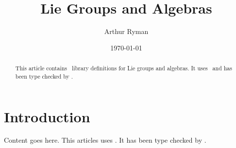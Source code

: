 \documentclass{amsart}
\begin{document}
\title{Lie Groups and Algebras}
\author{Arthur Ryman}
\date{\today}

\begin{abstract}
    This article contains \mathz\ library definitions for
    Lie groups and algebras.
    It uses \ZN\ and has been type checked by \fuzz.
\end{abstract}

\maketitle

\tableofcontents

\section{Introduction}

Content goes here.
This articles uses \ZN\cite{spivey-zrm}.
It has been type checked by \fuzz\cite{spivey-fm}.

\printbibliography
\end{document}

